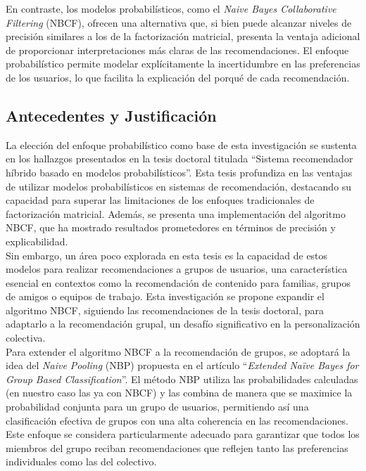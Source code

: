 \documentclass[runningheads,a4paper]{llncs}
\begin{document}
En contraste, los modelos probabilísticos, 
como el \textit{Naive Bayes Collaborative Filtering} (NBCF), 
ofrecen una alternativa que, si bien puede alcanzar 
niveles de precisión similares a los de la 
factorización matricial, presenta la ventaja adicional 
de proporcionar interpretaciones más claras de las 
recomendaciones. El enfoque probabilístico permite 
modelar explícitamente la incertidumbre en las 
preferencias de los usuarios, lo que facilita la 
explicación del porqué de cada recomendación.

\subsection{Antecedentes y Justificación}

La elección del enfoque probabilístico como base de 
esta investigación se sustenta en los hallazgos 
presentados en la tesis doctoral titulada 
``Sistema recomendador híbrido basado en modelos 
probabilísticos''. Esta tesis profundiza en las ventajas 
de utilizar modelos probabilísticos en sistemas de 
recomendación, destacando su capacidad para superar 
las limitaciones de los enfoques tradicionales de 
factorización matricial. Además, se presenta una 
implementación del algoritmo NBCF, que ha mostrado 
resultados prometedores en términos de precisión y 
explicabilidad.\\

Sin embargo, un área poco explorada en esta tesis es 
la capacidad de estos modelos para realizar 
recomendaciones a grupos de usuarios, una 
característica esencial en contextos como la 
recomendación de contenido para familias, grupos de 
amigos o equipos de trabajo. Esta investigación se 
propone expandir el algoritmo NBCF, siguiendo las 
recomendaciones de la tesis doctoral, para adaptarlo 
a la recomendación grupal, un desafío significativo 
en la personalización colectiva.\\

Para extender el algoritmo NBCF a la recomendación de 
grupos, se adoptará la idea del \textit{Naive Pooling} (NBP) 
propuesta en el artículo ``\textit{Extended Naïve Bayes for 
Group Based Classification}''\cite{nbp}. El método NBP utiliza 
las probabilidades calculadas (en nuestro caso las ya 
con NBCF) y las 
combina de manera que se maximice la probabilidad 
conjunta para un grupo de usuarios, permitiendo así 
una clasificación efectiva de grupos con una alta 
coherencia en las recomendaciones. Este enfoque se 
considera particularmente adecuado para garantizar 
que todos los miembros del grupo reciban 
recomendaciones que reflejen tanto las preferencias 
individuales como las del colectivo.
\end{document}
